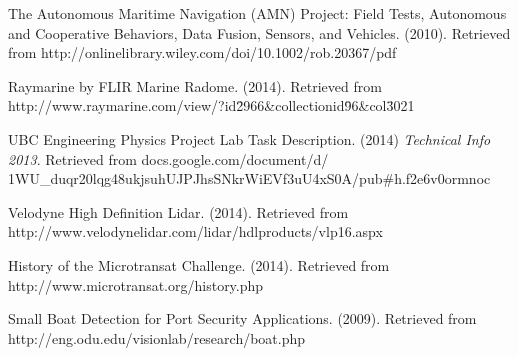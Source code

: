 \begin{thebibliography}{999}


 The Autonomous Maritime Navigation (AMN) Project:
Field Tests, Autonomous and Cooperative Behaviors,
Data Fusion, Sensors, and Vehicles. (2010). Retrieved from http://onlinelibrary.wiley.com/doi/10.1002/rob.20367/pdf

 Raymarine by FLIR Marine Radome. (2014). Retrieved from http://www.raymarine.com/view/?id\=2966\&collectionid\=96\&col\=3021

 UBC Engineering Physics Project Lab Task Description. (2014) \textit{Technical Info 2013}. Retrieved from docs.google.com/document/d/\\1WU\_duqr20lqg48ukjsuhUJPJhsSNkrWiEVf3uU4xS0A/pub\#h.f2e6v0ormnoc

 Velodyne High Definition Lidar. (2014). Retrieved from http://www.velodynelidar.com/lidar/hdlproducts/vlp16.aspx

 History of the Microtransat Challenge. (2014). Retrieved from http://www.microtransat.org/history.php

 Small Boat Detection for Port Security Applications. (2009). Retrieved from http://eng.odu.edu/visionlab/research/boat.php

\end{thebibliography}